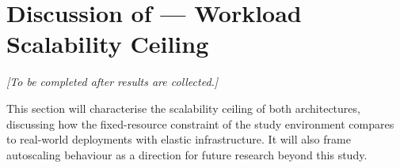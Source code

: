 \section{Discussion of  --- Workload Scalability Ceiling}

\textit{[To be completed after results are collected.]}

This section will characterise the scalability ceiling of both architectures, discussing
how the fixed-resource constraint of the study environment compares to real-world
deployments with elastic infrastructure. It will also frame autoscaling behaviour
\citep{nguyen2020, choi2021} as a direction for future research beyond this study.
